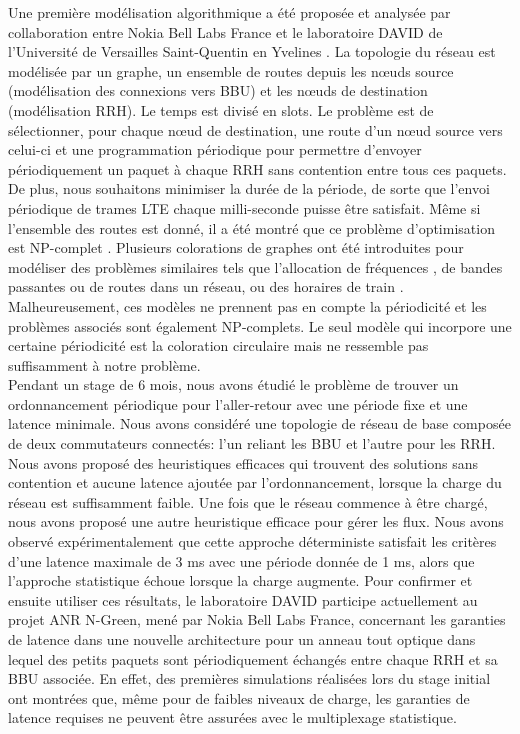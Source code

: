 \documentclass{article}
\begin{document}
Une première modélisation algorithmique a été proposée et analysée par collaboration entre Nokia Bell Labs France et le laboratoire DAVID de l'Université de Versailles Saint-Quentin en Yvelines \cite{Mael2017}. La topologie du réseau est modélisée par un graphe, un ensemble de routes depuis les nœuds source (modélisation des connexions vers BBU) et les nœuds de destination (modélisation RRH). Le temps est divisé en slots. Le problème est de sélectionner, pour chaque nœud de destination, une route d'un nœud source vers celui-ci et une programmation périodique pour permettre d'envoyer périodiquement un paquet à chaque RRH sans contention entre tous ces paquets. De plus, nous souhaitons minimiser la durée de la période, de sorte que l'envoi périodique de trames LTE chaque milli-seconde puisse être satisfait. Même si l'ensemble des routes est donné, il a été montré que ce problème d'optimisation est NP-complet \cite{rapportstage}. Plusieurs colorations de graphes ont été introduites pour modéliser des problèmes similaires tels que l'allocation de fréquences \cite{borndorfer1998frequency}, de bandes passantes \cite{erlebach2001complexity} ou de routes \cite{cole1996benefit} dans un réseau, ou des horaires de train \cite{strotmann2007railway}. Malheureusement, ces modèles ne prennent pas en compte la périodicité et les problèmes associés sont également NP-complets. Le seul modèle qui incorpore une certaine périodicité est la coloration circulaire \cite{zhu2006recent, zhou2013multiple, zhu2001circular} mais ne ressemble pas suffisamment à notre problème. \\

Pendant un stage de 6 mois, nous avons étudié le problème de trouver un ordonnancement périodique pour l'aller-retour avec une période fixe et une latence minimale. Nous avons considéré une topologie de réseau de base composée de deux commutateurs connectés: l'un reliant les BBU et l'autre pour les RRH. Nous avons proposé des heuristiques efficaces qui trouvent des solutions sans contention et aucune latence ajoutée par l'ordonnancement, lorsque la charge du réseau est suffisamment faible. Une fois que le réseau commence à être chargé, nous avons proposé une autre heuristique efficace pour gérer les flux. Nous avons observé expérimentalement que cette approche déterministe satisfait les critères d'une latence maximale de 3 ms avec une période donnée de 1 ms, alors que l'approche statistique échoue lorsque la charge augmente. Pour confirmer et ensuite utiliser ces résultats, le laboratoire DAVID participe actuellement au projet ANR N-Green, mené par Nokia Bell Labs France, concernant les garanties de latence dans une nouvelle architecture pour un anneau tout optique dans lequel des petits paquets sont  périodiquement échangés entre chaque RRH et sa BBU associée. En effet, des premières simulations réalisées lors du stage initial ont montrées que, même pour de faibles niveaux de charge, les garanties de latence requises ne peuvent être assurées avec le multiplexage statistique.
\end{document}
